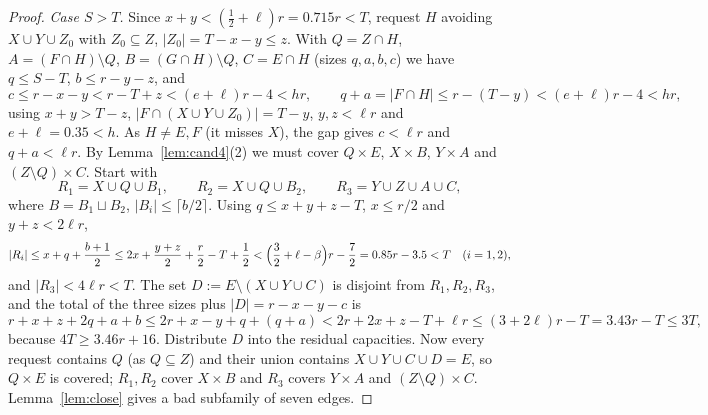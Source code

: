 \documentclass[11pt]{amsart}
\theoremstyle{definition}
\theoremstyle{remark}
\newcommand{\ceil}[1]{\lceil #1\rceil}
\begin{document}
\begin{proof}
\emph{Case $S>T$.} Since $x+y<(\tfrac12+\ell)r=0.715r<T$, request $H$ avoiding $X\cup Y\cup Z_0$ with $Z_0\subseteq Z$, $|Z_0|=T-x-y\le z$. With $Q=Z\cap H$, $A=(F\cap H)\setminus Q$, $B=(G\cap H)\setminus Q$, $C=E\cap H$ (sizes $q,a,b,c$) we have $q\le S-T$, $b\le r-y-z$, and
\[
c\le r-x-y<r-T+z<(e+\ell)r-4<hr,\qquad q+a=|F\cap H|\le r-(T-y)<(e+\ell)r-4<hr ,
\]
using $x+y>T-z$, $|F\cap(X\cup Y\cup Z_0)|=T-y$, $y,z<\ell r$ and $e+\ell=0.35<h$. As $H\ne E,F$ (it misses $X$), the gap gives $c<\ell r$ and $q+a<\ell r$. By Lemma~\ref{lem:cand4}(2) we must cover $Q\times E$, $X\times B$, $Y\times A$ and $(Z\setminus Q)\times C$. Start with
\[
R_1=X\cup Q\cup B_1,\qquad R_2=X\cup Q\cup B_2,\qquad R_3=Y\cup Z\cup A\cup C,
\]
where $B=B_1\sqcup B_2$, $|B_i|\le\ceil{b/2}$. Using $q\le x+y+z-T$, $x\le r/2$ and $y+z<2\ell r$,
\[
|R_i|\le x+q+\frac{b+1}{2}\le 2x+\frac{y+z}{2}+\frac r2-T+\frac12<\Bigl(\frac32+\ell-\beta\Bigr)r-\frac72=0.85r-3.5<T\quad(i=1,2),
\]
and $|R_3|<4\ell r<T$. The set $D:=E\setminus(X\cup Y\cup C)$ is disjoint from $R_1,R_2,R_3$, and the total of the three sizes plus $|D|=r-x-y-c$ is
\[
r+x+z+2q+a+b\le 2r+x-y+q+(q+a)<2r+2x+z-T+\ell r\le(3+2\ell)r-T=3.43r-T\le3T,
\]
because $4T\ge3.46r+16$. Distribute $D$ into the residual capacities. Now every request contains $Q$ (as $Q\subseteq Z$) and their union contains $X\cup Y\cup C\cup D=E$, so $Q\times E$ is covered; $R_1,R_2$ cover $X\times B$ and $R_3$ covers $Y\times A$ and $(Z\setminus Q)\times C$. Lemma~\ref{lem:close} gives a bad subfamily of seven edges.
\end{proof}
\end{document}
